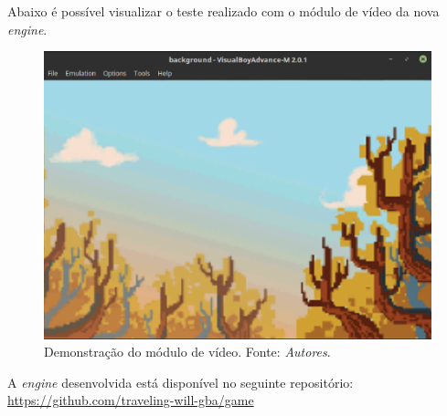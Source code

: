 Abaixo é possível visualizar o teste realizado com o módulo de vídeo da nova \textit{engine}.

\begin{figure}[H]
 \centering \includegraphics[keepaspectratio=true,scale=0.6]{figuras/video-test.eps}
   \caption[Demonstração do módulo de vídeo]
    {Demonstração do módulo de vídeo. Fonte: \textit{Autores}.}
   \label{demo-video}
\end{figure}

A \textit{engine} desenvolvida está disponível no seguinte repositório: \url{https://github.com/traveling-will-gba/game}